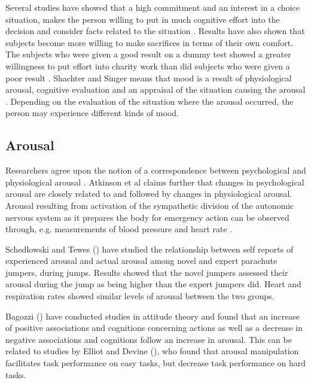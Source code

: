 \documentclass[jou,11pt]{apa6}
\begin{document}
Several studies have showed that a high commitment and an interest in
a choice situation, makes the person willing to put in much cognitive
effort into the decision and consider facts related to the situation
\parencite{festinger64, Izard77, JanisMann77}.  Results have also
shown that subjects become more willing to make sacrifices in terms of
their own comfort.  The subjects who were given a good result on a
dummy test showed a greater willingness to put effort into charity
work than did subjects who were given a poor result \parencite{Weyant78}.
Shachter and Singer means that mood is a result of physiological
arousal, cognitive evaluation and an appraisal of the situation
causing the arousal \parencite{SchachterSinger62}.  Depending on the
evaluation of the situation where the arousal occurred, the person may
experience different kinds of mood.


\subsection{Arousal}

Researchers agree upon the notion of a correspondence between
psychological and physiological arousal \parencite{Atkinson93}.
Atkinson et al claims further that changes in
psychological arousal are closely related to and followed by changes
in physiological arousal.  Arousal resulting from activation of the
sympathetic division of the autonomic nervous system as it prepares
the body for emergency action can be observed through,
e.g. measurements of blood pressure and heart rate
\parencite{Atkinson93}.

Schedlowski and Tewes (\citeyear{SchedlowskiTewes92}) have studied the
relationship between self reports of experienced arousal and actual
arousal among novel and expert parachute jumpers, during jumps.
Results showed that the novel jumpers assessed their arousal during
the jump as being higher than the expert jumpers did.  Heart and
respiration rates showed similar levels of arousal between the two
groups.

Bagozzi (\citeyear{Bagozzi95}) have conducted studies in attitude
theory and  found 
that an increase of positive associations and cognitions concerning
actions as well as a decrease in negative associations and cognitions
follow an increase in arousal. This can be related to studies by
Elliot and Devine (\citeyear{ElliotDevine94}), who found that arousal
manipulation facilitates task performance on easy tasks, but decrease
task performance on hard tasks.
\end{document}
